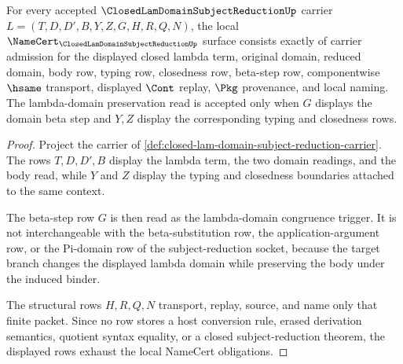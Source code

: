\begin{theorem}
\label{thm:closed-lam-domain-subject-reduction-namecert-obligations}
For every accepted $\ClosedLamDomainSubjectReductionUp$ carrier $L=(T,D,D',B,Y,Z,G,H,R,Q,N)$, the local $\NameCert_{\ClosedLamDomainSubjectReductionUp}$ surface consists exactly of carrier admission for the displayed closed lambda term, original domain, reduced domain, body row, typing row, closedness row, beta-step row, componentwise $\hsame$ transport, displayed $\Cont$ replay, $\Pkg$ provenance, and local naming. The lambda-domain preservation read is accepted only when $G$ displays the domain beta step and $Y,Z$ display the corresponding typing and closedness rows.
\end{theorem}
\begin{proof}
Project the carrier of \autoref{def:closed-lam-domain-subject-reduction-carrier}. The rows $T,D,D',B$ display the lambda term, the two domain readings, and the body read, while $Y$ and $Z$ display the typing and closedness boundaries attached to the same context.

The beta-step row $G$ is then read as the lambda-domain congruence trigger. It is not interchangeable with the beta-substitution row, the application-argument row, or the Pi-domain row of the subject-reduction socket, because the target branch changes the displayed lambda domain while preserving the body under the induced binder.

The structural rows $H,R,Q,N$ transport, replay, source, and name only that finite packet. Since no row stores a host conversion rule, erased derivation semantics, quotient syntax equality, or a closed subject-reduction theorem, the displayed rows exhaust the local NameCert obligations.
\end{proof}

